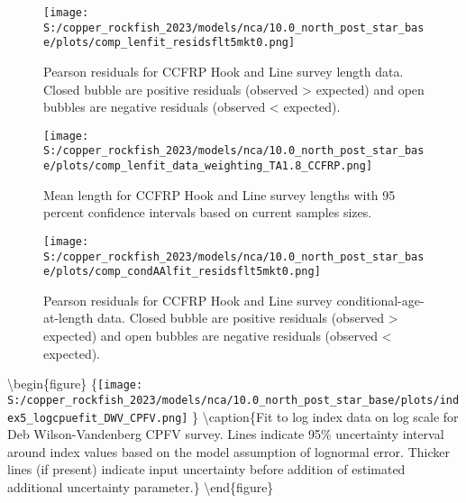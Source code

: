 \documentclass[11pt,
  letterpaper,
]{article}
\begin{document}
\begin{figure}
{\centering
\texttt{[image: S:/copper\_rockfish\_2023/models/nca/10.0\_north\_post\_star\_base/plots/comp\_lenfit\_residsflt5mkt0.png]}
}
\caption{Pearson residuals for CCFRP Hook and Line survey length data. Closed bubble are positive residuals (observed > expected) and open bubbles are negative residuals (observed < expected).\label{fig:ccfrp-len-pearson}}
\end{figure}

\pagebreak

\begin{figure}
{\centering
\texttt{[image: S:/copper\_rockfish\_2023/models/nca/10.0\_north\_post\_star\_base/plots/comp\_lenfit\_data\_weighting\_TA1.8\_CCFRP.png]}
}
\caption{Mean length for CCFRP Hook and Line survey lengths with 95 percent confidence intervals based on current samples sizes.\label{fig:ccfrp-mean-len-fit}}
\end{figure}

\pagebreak

\begin{figure}
{\centering
\texttt{[image: S:/copper\_rockfish\_2023/models/nca/10.0\_north\_post\_star\_base/plots/comp\_condAAlfit\_residsflt5mkt0.png]}
}
\caption{Pearson residuals for CCFRP Hook and Line survey conditional-age-at-length data. Closed bubble are positive residuals (observed > expected) and open bubbles are negative residuals (observed < expected).\label{fig:ccfrp-age-pearson}}
\end{figure}

\pagebreak

\pagebreak

\pagebreak

\pagebreak

\textbackslash begin\{figure\} \{\centering \texttt{[image: S:/copper\_rockfish\_2023/models/nca/10.0\_north\_post\_star\_base/plots/index5\_logcpuefit\_DWV\_CPFV.png]} \} \textbackslash caption\{Fit to log index data on log scale for Deb Wilson-Vandenberg CPFV survey. Lines indicate 95\% uncertainty interval around index values based on the model assumption of lognormal error. Thicker lines (if present) indicate input uncertainty before addition of estimated additional uncertainty parameter.\label{fig:dwv-cpfv-index-fit}\} \textbackslash end\{figure\}
\end{document}

